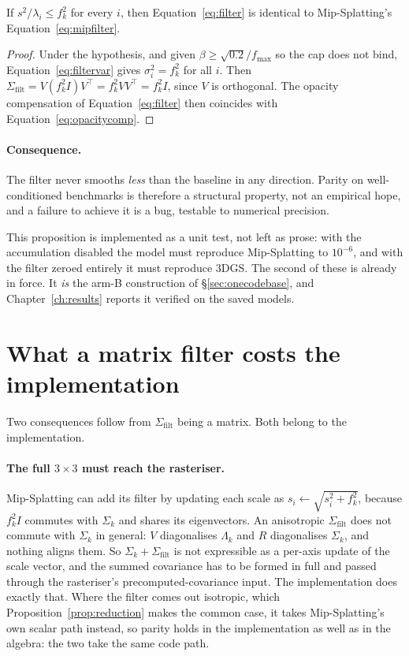 \begin{proposition}
\label{prop:reduction}
If $s^2/\lambda_i \le f_k^2$ for every $i$, then Equation~\eqref{eq:filter} is
identical to Mip-Splatting's Equation~\eqref{eq:mipfilter}.
\end{proposition}

\begin{proof}
Under the hypothesis, and given $\beta \ge \sqrt{0.2}/f_{\max}$ so the cap does
not bind, Equation~\eqref{eq:filtervar} gives $\sigma_i^2 = f_k^2$ for all $i$.
Then $\Sigma_{\mathrm{filt}} = V(f_k^2 I)V^{\!\top} = f_k^2 VV^{\!\top} = f_k^2 I$,
since $V$ is orthogonal. The opacity compensation of Equation~\eqref{eq:filter}
then coincides with Equation~\eqref{eq:opacitycomp}.
\end{proof}

\paragraph{Consequence.} The filter never smooths \emph{less} than the baseline
in any direction. Parity on well-conditioned benchmarks is therefore a
structural property, not an empirical hope, and a failure to achieve it is a
bug, testable to numerical precision.

This proposition is implemented as a unit test, not left as prose: with
the accumulation disabled the model must reproduce Mip-Splatting to $10^{-6}$,
and with the filter zeroed entirely it must reproduce 3DGS. The second of these
is already in force. It \emph{is} the arm-B construction of
\S\ref{sec:onecodebase}, and Chapter~\ref{ch:results} reports it verified on the saved models.

\section{What a matrix filter costs the implementation}
\label{sec:implcost}

Two consequences follow from $\Sigma_{\mathrm{filt}}$ being a matrix. Both belong to the implementation.

\paragraph{The full $3\times3$ must reach the rasteriser.} Mip-Splatting can add
its filter by updating each scale as $s_i \leftarrow \sqrt{s_i^2 + f_k^2}$,
because $f_k^2 I$ commutes with $\Sigma_k$ and shares its eigenvectors. An
anisotropic $\Sigma_{\mathrm{filt}}$ does not commute with $\Sigma_k$ in general:
$V$ diagonalises $\Lambda_k$ and $R$ diagonalises $\Sigma_k$, and nothing aligns
them. So $\Sigma_k + \Sigma_{\mathrm{filt}}$ is not expressible as a per-axis
update of the scale vector, and the summed covariance has to be formed in full
and passed through the rasteriser's precomputed-covariance input. The implementation does exactly that. Where the filter comes out isotropic, which Proposition~\ref{prop:reduction}
makes the common case, it takes Mip-Splatting's own scalar path instead, so parity holds in the implementation as well as in the algebra: the two take
the same code path.


